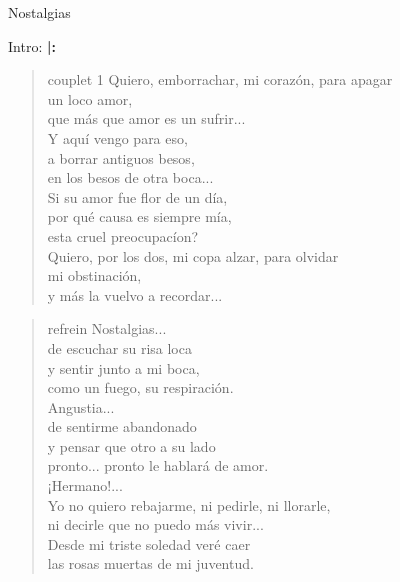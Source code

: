 \begin{song}[tango]{Nostalgias}
\begin{instrumental}{Intro:}
	\textbf{|:}
\end{instrumental}

\begin{verse}{couplet 1}
Quiero, emborrachar, mi corazón, para apagar\\
un loco amor,\\
que más que amor es un sufrir...\\
Y aquí vengo para eso,\\
a borrar antiguos besos,\\
en los besos de otra boca...\\ 
Si su amor fue flor de un día,\\
\textquestiondown por qué causa es siempre mía,\\
esta cruel preocupacíon? \hspace{\wlskip} \\
Quiero, por los dos, mi copa alzar, para olvidar\\
mi obstinación,\\
y más la vuelvo a recordar...
\end{verse}

\begin{verse}{refrein}
Nostalgias...\\
de escuchar su risa loca\\
y sentir junto a mi boca,\\
como un fuego, su respiración.\\
Angustia...\\
\chord{---}de sentirme abandonado\\
y pensar que otro a su lado\\
pronto... pronto le hablará de amor.\\
¡Hermano!...   \chord{---}\\
Yo no quiero rebajarme, ni pedirle, ni llorarle,\\
ni decirle que no puedo más vivir...\\
Desde mi triste soledad veré caer\\
las rosas muertas de mi juventud.
\end{verse}


\end{song}
